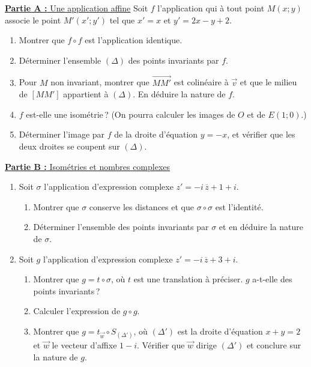 \underline{\textbf{Partie A :} Une application affine} \newline
Soit $f$ l'application qui \`a tout point $M(x ; y)$ associe le point $M'(x' ; y')$ tel que $x' = x$ et $y' = 2x - y + 2$.
\begin{enumerate}
      \item Montrer que $f \circ f$ est l'application identique.
      \item D\'eterminer l'ensemble $(\Delta)$ des points invariants par $f$.
      \item Pour $M$ non invariant, montrer que $\overrightarrow{MM'}$ est colin\'eaire \`a $\vec{v}$ et que le milieu de $[MM']$ appartient \`a $(\Delta)$.
            En d\'eduire la nature de $f$.
      \item $f$ est-elle une isom\'etrie\,? (On pourra calculer les images de $O$ et de $E(1 ; 0)$.)
      \item D\'eterminer l'image par $f$ de la droite d'\'equation $y = -x$, et v\'erifier que les deux droites se coupent sur $(\Delta)$.
\end{enumerate}
\underline{\textbf{Partie B :} Isom\'etries et nombres complexes}
\begin{enumerate}
      \item Soit $\sigma$ l'application d'expression complexe $z' = -i\,\overline{z} + 1 + i$.
            \begin{enumerate}
            \item Montrer que $\sigma$ conserve les distances et que $\sigma \circ \sigma$ est l'identit\'e.
            \item D\'eterminer l'ensemble des points invariants par $\sigma$ et en d\'eduire la nature de $\sigma$.
            \end{enumerate}
      \item Soit $g$ l'application d'expression complexe $z' = -i\,\overline{z} + 3 + i$.
            \begin{enumerate}
            \item Montrer que $g = t \circ \sigma$, o\`u $t$ est une translation \`a pr\'eciser. $g$ a-t-elle des points invariants\,?
            \item Calculer l'expression de $g \circ g$.
            \item Montrer que $g = t_{\vec{w}} \circ S_{(\Delta')}$, o\`u $(\Delta')$ est la droite d'\'equation $x + y = 2$ et
                  $\vec{w}$ le vecteur d'affixe $1 - i$. V\'erifier que $\vec{w}$ dirige $(\Delta')$ et conclure sur la nature de $g$.
            \end{enumerate}
\end{enumerate}

